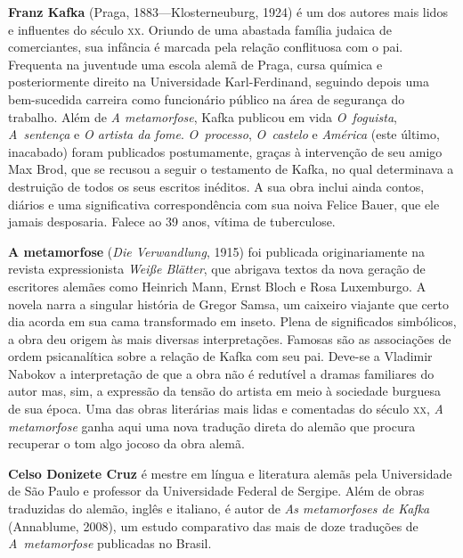 \textbf{Franz Kafka} (Praga, 1883---Klosterneuburg, 1924) é um dos autores mais lidos 
e influentes do século \textsc{xx}. Oriundo de uma abastada família judaica de
comerciantes, sua infância é marcada pela relação conflituosa com o pai.
Frequenta na juventude uma escola alemã de Praga, cursa química e
posteriormente direito na Universidade Karl{}-Ferdinand, seguindo depois 
uma bem{}-sucedida carreira como funcionário público na área de segurança do trabalho. 
Além de \textit{A metamorfose}, Kafka publicou em vida \textit{O~foguista}, \textit{A~sentença}
e \textit{O artista da fome}. \textit{O~processo}, \textit{O~castelo} e \textit{América} 
(este último, inacabado) foram publicados postumamente, graças à intervenção de 
seu amigo Max Brod, que se recusou a seguir o testamento de Kafka, no qual 
determinava a destruição de todos os seus escritos inéditos. A sua obra inclui
ainda contos, diários e uma significativa correspondência com sua noiva Felice
Bauer, que ele jamais desposaria. Falece ao 39 anos, vítima de tuberculose.

\textbf{A metamorfose} (\textit{Die Verwandlung}, 1915) foi publicada
originariamente na revista expressionista \textit{Weiße Blätter}, que abrigava
textos da nova geração de escritores alemães como Heinrich Mann, Ernst Bloch e
Rosa Luxemburgo. A novela narra a singular história de Gregor Samsa, um caixeiro
viajante que certo dia acorda em sua cama transformado em inseto. Plena de
significados simbólicos, a obra deu origem às mais diversas interpretações.
Famosas são as associações de ordem psicanalítica sobre a relação de Kafka 
com seu pai. Deve{}-se a Vladimir Nabokov a interpretação de que a obra não é
redutível a dramas familiares do autor mas, sim, a expressão da tensão do artista
em meio à sociedade burguesa de sua época. Uma das obras literárias mais lidas e comentadas
do século \textsc{xx}, \textit{A metamorfose} ganha aqui uma nova tradução direta do
alemão que procura recuperar o tom algo jocoso da obra alemã.
        
\textbf{Celso Donizete Cruz} é mestre em  língua e literatura alemãs pela
Universidade de São Paulo e professor da Universidade Federal de Sergipe. Além
de obras traduzidas do alemão, inglês e italiano, é autor de \textit{As
metamorfoses de Kafka} (Annablume, 2008), um estudo comparativo das mais de doze
traduções de \textit{A~metamorfose} publicadas no Brasil.